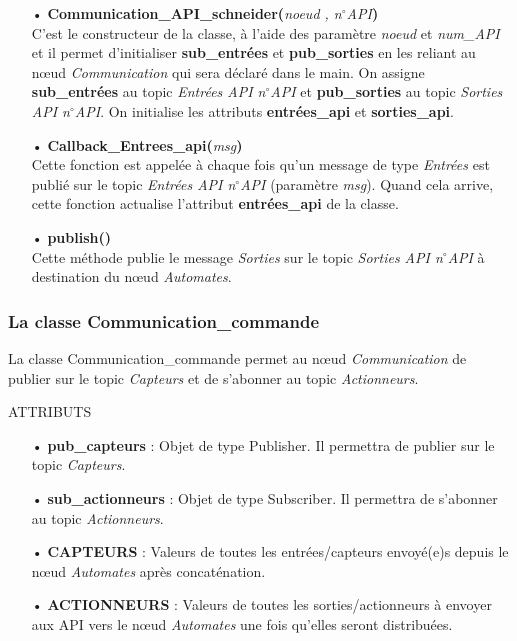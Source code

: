 \documentclass[a4paper,french, titlepage]{book}
\begin{document}
\begin{itemize}
\item[•] \textbf{Communication\_API\_schneider(}\emph{noeud , n$^\circ$API}\textbf{)}\\
C'est le constructeur de la classe, à l'aide des paramètre \emph{noeud} et \emph{num\_API} et il permet d'initialiser \textbf{sub\_entrées} et \textbf{pub\_sorties} en les reliant au nœud \emph{Communication} qui sera déclaré dans le main. On assigne \textbf{sub\_entrées} au topic \emph{Entrées API n$^\circ$API} et \textbf{pub\_sorties} au topic \emph{Sorties API n$^\circ$API}. On initialise les attributs \textbf{entrées\_api} et \textbf{sorties\_api}.
\item[ ] 
\item[•] \textbf{Callback\_Entrees\_api(}\emph{msg}\textbf{)}\\
Cette fonction est appelée à chaque fois qu'un message de type \emph{Entrées} est publié sur le topic \emph{Entrées API n$^\circ$API} (paramètre \emph{msg}). Quand cela arrive, cette fonction actualise l'attribut \textbf{entrées\_api} de la classe.
\item[ ] 
\item[•] \textbf{publish()}\\
Cette méthode publie le message \emph{Sorties} sur le topic \emph{Sorties API n$^\circ$API} à destination du nœud \emph{Automates}.


\end{itemize}

\subsubsection{La classe Communication\_commande}

La classe Communication\_commande permet au nœud \emph{Communication} de publier sur le topic \emph{Capteurs} et de s'abonner au topic \emph{Actionneurs}.

\begin{center}
ATTRIBUTS
\end{center}

\begin{itemize}
\item[•] \textbf{pub\_capteurs} : Objet de type Publisher. Il permettra de publier sur le topic \emph{Capteurs}.
\item[•] \textbf{sub\_actionneurs} : Objet de type Subscriber. Il permettra de s'abonner au topic \emph{Actionneurs}.
\item[•] \textbf{CAPTEURS} : Valeurs de toutes les entrées/capteurs envoyé(e)s depuis le nœud \emph{Automates} après concaténation.
\item[•] \textbf{ACTIONNEURS} : Valeurs de toutes les sorties/actionneurs à envoyer aux API vers le nœud \emph{Automates} une fois qu'elles seront distribuées.
\end{itemize}
\end{document}
